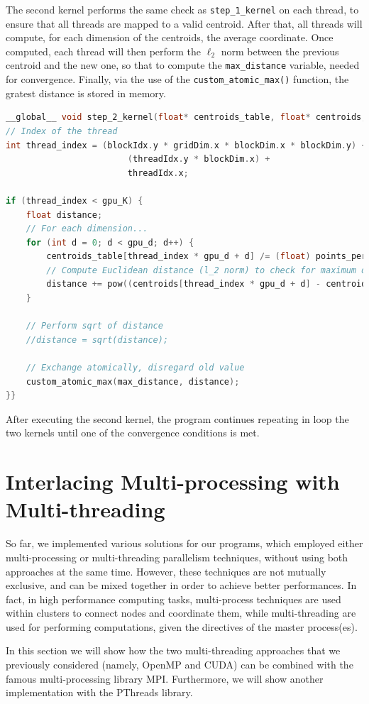\documentclass[11pt, journal]{IEEEtran}
\newcommand{\nwl}{

\vspace{11pt}

}
\begin{document}
The second kernel performs the same check as \verb|step_1_kernel| on each thread, to ensure that all threads are mapped to a valid centroid. After that, all threads will compute, for each dimension of the centroids, the average coordinate. Once computed, each thread will then perform the $\ell_2$ norm between the previous centroid and the new one, so that to compute the \verb|max_distance| variable, needed for convergence. Finally, via the use of the \verb|custom_atomic_max()| function, the gratest distance is stored in memory.
\nwl
\begin{lstlisting}[language = C]
__global__ void step_2_kernel(float* centroids_table, float* centroids, int* points_per_class, float* max_distance) {
// Index of the thread
int thread_index = (blockIdx.y * gridDim.x * blockDim.x * blockDim.y) + (blockIdx.x * blockDim.x * blockDim.y) +
                        (threadIdx.y * blockDim.x) +
                        threadIdx.x;

if (thread_index < gpu_K) {
    float distance;
    // For each dimension...
    for (int d = 0; d < gpu_d; d++) {
        centroids_table[thread_index * gpu_d + d] /= (float) points_per_class[thread_index];
        // Compute Euclidean distance (l_2 norm) to check for maximum distance
        distance += pow((centroids[thread_index * gpu_d + d] - centroids_table[thread_index * gpu_d + d]), 2);
    }

    // Perform sqrt of distance
    //distance = sqrt(distance);

    // Exchange atomically, disregard old value
    custom_atomic_max(max_distance, distance);
}}
\end{lstlisting}

After executing the second kernel, the program continues repeating in loop the two kernels until one of the convergence conditions is met.

\section{Interlacing Multi-processing with Multi-threading}

So far, we implemented various solutions for our programs, which employed either multi-processing or multi-threading parallelism techniques, without using both approaches at the same time. However, these techniques are not mutually exclusive, and can be mixed together in order to achieve better performances. In fact, in high performance computing tasks, multi-process techniques are used within clusters to connect nodes and coordinate them, while multi-threading are used for performing computations, given the directives of the master process(es).
\nwl
In this section we will show how the two multi-threading approaches that we previously considered (namely, OpenMP and CUDA) can be combined with the famous multi-processing library MPI. Furthermore, we will show another implementation with the PThreads library.
\end{document}
